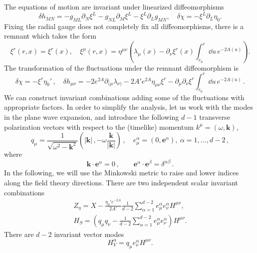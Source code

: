The equations of motion are invariant under linearized diffeomorphisms
\begin{equation}
	\delta h_{MN}=-g_{ML}\partial_N \xi^L-g_{NL}\partial_M \xi^L-\xi^L\partial_L g_{MN},\quad \delta \chi=-\xi^L\partial_L\eta_0.
\end{equation}
Fixing the radial gauge does not completely fix all diffeomorphisms, there is a remnant which takes the form
\begin{equation}
	\xi^r(r,x)=\xi^r(x),\quad \xi^\mu(r,x)=\eta^{\mu\nu}\left(\lambda_\mu(x)-\partial_\nu\xi^r(x)\int_{r_0}^r \dd u\, e^{-2A(u)}\right).
\end{equation}
The transformation of the fluctuations under the remnant diffeomorphism is
\begin{equation}
	\delta \chi=-\xi^r\eta_0'
	\,,\quad 
	\delta h_{\mu\nu}=-2e^{2A}\partial_{(\mu}\lambda_{\nu)}-2 A' e^{2A}\eta_{\mu\nu}\xi^r-\partial_\mu\partial_\nu\xi^r\int_{r_0}^r \dd u\, e^{-2A(u)}\,.
\end{equation}
We can construct invariant combinations adding some of the fluctuations with appropriate factors.
In order to simplify the analysis, let us work with the modes in the plane wave expansion, and introduce the following $d-1$ transverse polarization vectors with respect to the (timelike) momentum $k^\mu=(\omega,\bm{k})$,
\begin{equation}
q_\mu=\frac{1}{\sqrt{\omega^2-\bm{k}^2}}\left(|\bm{k}|\,,-\omega\frac{\bm{k}}{|\bm{k}|}\right)\,,\quad e_\mu^\alpha=(0,\bm{e}^\alpha), \ \alpha=1,\dots,d-2\,,
\end{equation}
where
\begin{equation}
     \bm{k}\cdot\bm{e}^\alpha=0
     \,,\qquad \bm{e}^\alpha\cdot\bm{e}^\beta=\delta^{\alpha\beta}\,.
\end{equation}
In the following, we will use the Minkowski metric to raise and lower indices along the field theory directions.
There are two independent scalar invariant combinations
\begin{eqnarray}
 \label{eq:zetaeta}   
 Z_\eta=X-\frac{\eta_0'e^{-2A}}{2A'}\frac{1}{d-2}\sum_{\alpha=1}^{d-2}e_\mu^\alpha e_\nu^\alpha H^{\mu\nu}
 ,\\
 \label{eq:HS}
 H_S=\left(q_\mu q_\nu-\frac{1}{d-2}\sum_{\alpha=1}^{d-2}e_\mu^\alpha e_\nu^\alpha\right)H^{\mu\nu}.
\end{eqnarray}
There are $d-2$ invariant vector modes 
\begin{equation}
	H_V^\alpha=q_\mu e_\nu^\alpha H^{\mu\nu}.
\end{equation}
